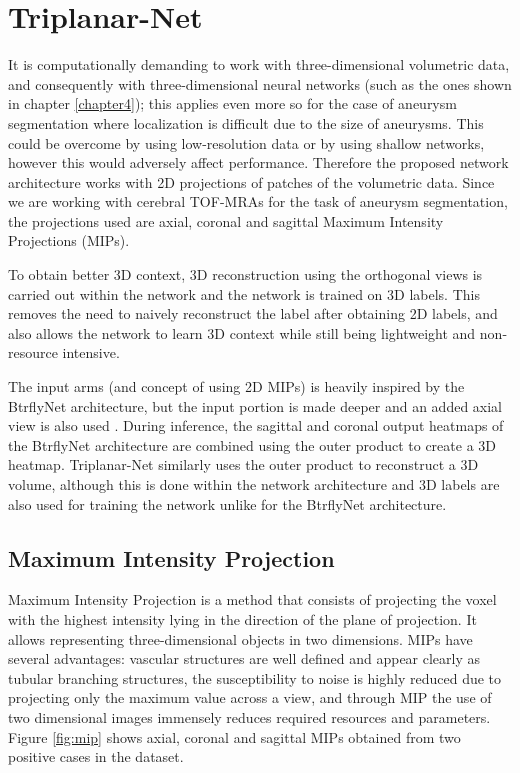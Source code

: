 \section{Triplanar-Net}
\label{chapter5}

It is computationally demanding to work with three-dimensional volumetric data, and consequently with three-dimensional neural networks (such as the ones shown in chapter \ref{chapter4}); this applies even more so for the case of aneurysm segmentation where localization is difficult due to the size of aneurysms. This could be overcome by using low-resolution data or by using shallow networks, however this would adversely affect performance. Therefore the proposed network architecture works with 2D projections of patches of the volumetric data. Since we are working with cerebral TOF-MRAs for the task of aneurysm segmentation, the projections used are axial, coronal and sagittal Maximum Intensity Projections (MIPs). 

To obtain better 3D context, 3D reconstruction using the orthogonal views is carried out within the network and the network is trained on 3D labels. This removes the need to naively reconstruct the label after obtaining 2D labels, and also allows the network to learn 3D context while still being lightweight and non-resource intensive. 

The input arms (and concept of using 2D MIPs) is heavily inspired by the BtrflyNet architecture, but the input portion is made deeper and an added axial view is also used \cite{sekuboyina2018}. During inference, the sagittal and coronal output heatmaps of the BtrflyNet architecture are combined using the outer product to create a 3D heatmap. Triplanar-Net similarly uses the outer product to reconstruct a 3D volume, although this is done within the network architecture and 3D labels are also used for training the network unlike for the BtrflyNet architecture.


\subsection{Maximum Intensity Projection}
Maximum Intensity Projection is a method that consists of projecting the voxel with the highest intensity lying in the direction of the plane of projection. It allows representing three-dimensional objects in two dimensions. MIPs have several advantages: vascular structures are well defined and appear clearly as tubular branching structures, the susceptibility to noise is highly reduced due to projecting only the maximum value across a view, and through MIP the use of two dimensional images immensely reduces required resources and parameters. Figure \ref{fig:mip} shows axial, coronal and sagittal MIPs obtained from two positive cases in the dataset. 

